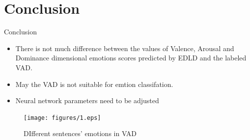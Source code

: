 \documentclass[
 size=14pt,
 paper=smartboard,  %
 mode=present, 		%
 display=slides, 	%
 style=tuliplab,  	%
 pauseslide,
 fleqn,leqno]{powerdot}
\begin{document}
\section{Conclusion}

\begin{slide}[toc=,bm=]{Conclusion}

\bigskip
\begin{itemize}
	\item
	\smallskip
	There is not much difference between 
	the values of Valence, Arousal and Dominance 
	dimensional emotions scores predicted by EDLD
	and the labeled VAD.
	
	\smallskip
	
	\item
	\smallskip
	May the VAD is not suitable 
	for emtion classifation.
	
	\item
	\smallskip
	Neural network parameters need to be adjusted
\end{itemize}

\begin{figure}
	\texttt{[image: figures/1.eps]}
	\caption{DIfferent sentences' emotions in VAD}
\end{figure}

\end{slide}


%

\begin{wideslide}[toc=,bm=]{}
	\centering
	\twocolumn[
	lcolwidth=0.35\linewidth,
	rcolwidth=0.65\linewidth
	]
	{
	}
	{
		
		
		\textcolor{black}{}
		
		
	}
\end{wideslide}

\end{document}
